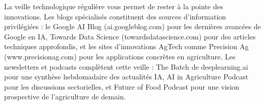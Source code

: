La veille technologique régulière vous permet de rester à la pointe des innovations. Les blogs spécialisés constituent des sources d'information privilégiées : le Google AI Blog (ai.googleblog.com) pour les dernières avancées de Google en IA, Towards Data Science (towardsdatascience.com) pour des articles techniques approfondis, et les sites d'innovations AgTech comme Precision Ag (www.precisionag.com) pour les applications concrètes en agriculture. Les newsletters et podcasts complètent cette veille : The Batch de deeplearning.ai pour une synthèse hebdomadaire des actualités IA, AI in Agriculture Podcast pour les discussions sectorielles, et Future of Food Podcast pour une vision prospective de l'agriculture de demain.
